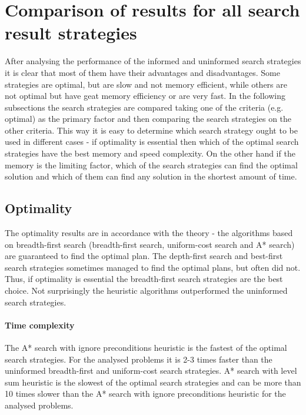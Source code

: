\documentclass[11pt]{article}
\begin{document}
\section{Comparison of results for all search result strategies}

After analysing the performance of the informed and uninformed search strategies it is clear that most of them have their advantages and disadvantages. Some strategies are optimal, but are slow and not memory efficient, while others are not optimal but have geat memory efficiency or are very fast. In the following subsections the search strategies are compared taking one of the criteria (e.g. optimal) as the primary factor and then comparing the search strategies on the other criteria. This way it is easy to determine which search strategy ought to be used in different cases - if optimality is essential then which of the optimal search strategies have the best memory and speed complexity. On the other hand if the memory is the limiting factor, which of the search strategies can find the optimal solution and which of them can find any solution in the shortest amount of time.

\subsection{Optimality}

The optimality results are in accordance with the theory - the algorithms based on breadth-first search (breadth-first search, uniform-cost search and A* search) are guaranteed to find the optimal plan. The depth-first search and best-first search strategies sometimes managed to find the optimal plans, but often did not. Thus, if optimality is essential the breadth-first search strategies are the best choice. Not surprisingly the heuristic algorithms outperformed the uninformed search strategies.

\paragraph{Time complexity}

The A* search with ignore preconditions heuristic is the fastest of the optimal search strategies. For the analysed problems it is 2-3 times faster than the uninformed breadth-first and uniform-cost search strategies. A* search with level sum heuristic is the slowest of the optimal search strategies and can be more than 10 times slower than the A* search with ignore preconditions heuristic for the analysed problems. 
\end{document}
